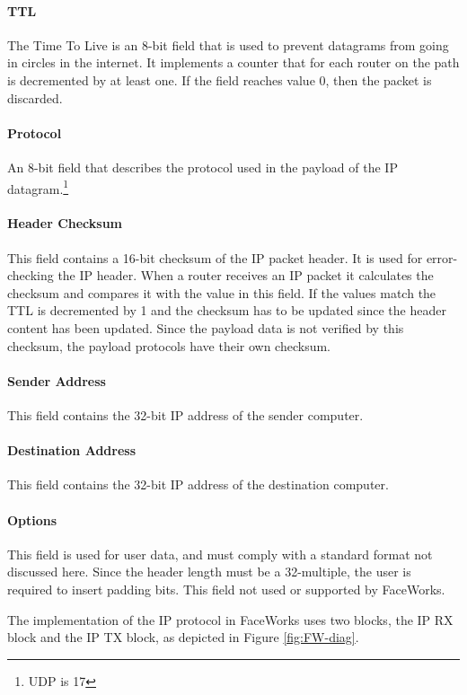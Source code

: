 \documentclass[defaultstyle,10pt,master,Helvetica]{thesis}
\begin{document}
\paragraph*{TTL} The Time To Live is an 8-bit field that is used to prevent datagrams from going in circles in the internet. It implements a counter that for each router on the path is decremented by at least one. If the field reaches value 0, then the packet is discarded.
\paragraph*{Protocol} An 8-bit field that describes the protocol used in the payload of the \ac{IP} datagram.\footnote{UDP is 17} 
\paragraph*{Header Checksum} This field contains a 16-bit checksum of the \ac{IP} packet header. It is used for error-checking the \ac{IP} header. When a router receives an \ac{IP} packet it calculates the checksum and compares it with the value in this field. If the values match the TTL is decremented by 1 and the checksum has to be updated since the header content has been updated. Since the payload data is not verified by this checksum, the payload protocols have their own checksum.
\paragraph*{Sender Address} This field contains the 32-bit \ac{IP} address of the sender computer.
\paragraph*{Destination Address} This field contains the 32-bit \ac{IP} address of the destination computer.
\paragraph*{Options} This field is used for user data, and must comply with a standard format not discussed here. Since the header length must be a 32-multiple, the user is required to insert padding bits. This field not used or supported by FaceWorks.

\vspace{10pt}
The implementation of the \ac{IP} protocol in FaceWorks uses two blocks, the \ac{IP} RX block and the \ac{IP} TX block, as depicted in Figure \ref{fig:FW-diag}. 
\end{document}
